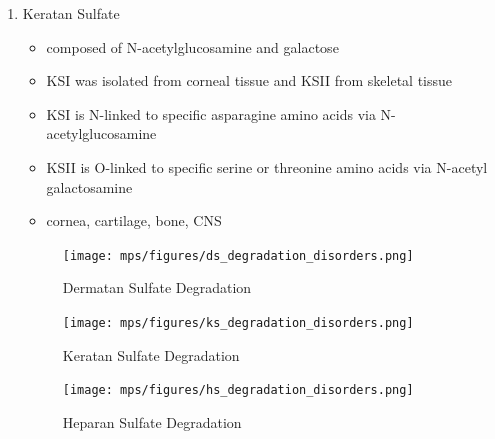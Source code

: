 \documentclass[12pt]{scrartcl}
\begin{document}
\begin{enumerate}
\item Keratan Sulfate
\label{sec:org9f683f0}
\begin{itemize}
\item composed of N-acetylglucosamine and galactose
\item KSI was isolated from corneal tissue and KSII from skeletal tissue
\item KSI is N-linked to specific asparagine amino acids via
N-acetylglucosamine
\item KSII is O-linked to specific serine or threonine amino acids via
N-acetyl galactosamine
\item cornea, cartilage, bone, CNS
\end{itemize}

\begin{figure}[htbp]
\centering
\texttt{[image: mps/figures/ds\_degradation\_disorders.png]}
\caption[DS Degradation]{\label{fig:orge36c8f7}Dermatan Sulfate Degradation}
\end{figure}

\begin{figure}[htbp]
\centering
\texttt{[image: mps/figures/ks\_degradation\_disorders.png]}
\caption[KS Degradation]{\label{fig:orgb319ddb}Keratan Sulfate Degradation}
\end{figure}

\begin{figure}[htbp]
\centering
\texttt{[image: mps/figures/hs\_degradation\_disorders.png]}
\caption[HS Degradation]{\label{fig:orga6db5af}Heparan Sulfate Degradation}
\end{figure}
\end{enumerate}
\end{document}
